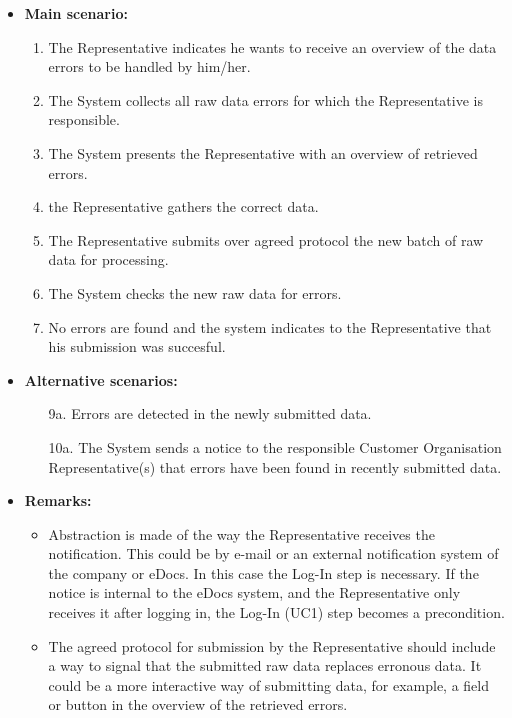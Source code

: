 \documentclass[a4paper,10pt]{article}
\begin{document}
\begin{itemize}
    \item \textbf{Main scenario:} 
        \begin{enumerate}
           \item The Representative indicates he wants to receive an overview of the data errors to be handled by him/her.
           \item The System collects all raw data errors for which the Representative is responsible.
           \item The System presents the Representative with an overview of retrieved errors.
           \item the Representative gathers the correct data.
           \item The Representative submits over agreed protocol the new batch of raw data for processing.
           \item The System checks the new raw data for errors.
           \item No errors are found and the system indicates to the Representative that his submission was succesful.
        \end{enumerate}

    \item \textbf{Alternative scenarios:} 
        \begin{enumerate}
            \item [9a.] Errors are detected in the newly submitted data.
            \item [10a.] The System sends a notice to the responsible Customer Organisation Representative(s) that errors have been found in recently submitted data.
        \end{enumerate}
    
    \item \textbf{Remarks:}
        \begin{itemize}
            \item Abstraction is made of the way the Representative receives the notification. This could be by e-mail or an external notification system of the company or eDocs. In this case the Log-In step is necessary. If the notice is internal to the eDocs system, and the Representative only receives it after logging in, the Log-In (UC1) step becomes a precondition.
            \item The agreed protocol for submission by the Representative should include a way to signal that the submitted raw data replaces erronous data. It could be a more interactive way of submitting data, for example, a field or button in the overview of the retrieved errors.
        \end{itemize}
\end{itemize}
\end{document}

